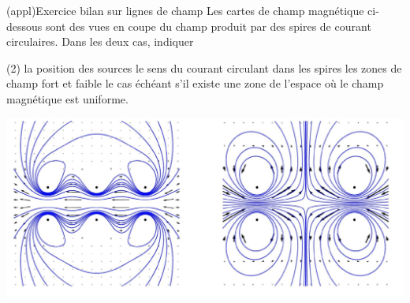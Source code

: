 \documentclass[../../main/main.tex]{subfiles}
\begin{document}
\begin{tcb*}[breakable](appl){Exercice bilan sur lignes de champ}
  Les cartes de champ magnétique ci-dessous sont des vues en coupe du champ
produit par des spires de courant circulaires. Dans les deux cas, indiquer
\begin{tasks}[label=\protect\fbox{\arabic*}](2)
  \task la position des sources
  \task le sens du courant circulant dans les spires
  \task les zones de champ fort et faible
  \task le cas échéant s'il existe une zone de l'espace où le champ magnétique
    est uniforme.
\end{tasks}
\begin{center}
  \includegraphics[scale=.8]{ldc_bilan.jpg}
\end{center}
\end{tcb*}

\vspace*{-10pt}
\end{document}

